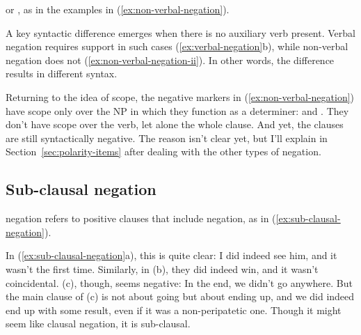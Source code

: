 \ea \label{ex:verbal-negation}
    \z
\z
\noindent or , as in the examples in (\ref{ex:non-verbal-negation}).

\ea \label{ex:non-verbal-negation}
    \label{ex:non-verbal-negation-i}
    \label{ex:non-verbal-negation-ii}
    \z
\z
A key syntactic difference emerges when there is no auxiliary verb present. Verbal negation requires  support in such cases (\ref{ex:verbal-negation}b), while non-verbal negation does not (\ref{ex:non-verbal-negation-ii}). In other words, the difference results in different syntax.

Returning to the idea of scope, the negative markers in (\ref{ex:non-verbal-negation}) have scope only over the NP in which they function as a determiner:  and . They don't have scope over the verb, let alone the whole clause. And yet, the clauses are still syntactically negative. The reason isn't clear yet, but I'll explain in Section~\ref{sec:polarity-items} after dealing with the other types of negation.

\subsection{Sub-clausal negation}

 negation refers to positive clauses that include negation, as in (\ref{ex:sub-clausal-negation}).

\ea \label{ex:sub-clausal-negation}
    \z
\z
In (\ref{ex:sub-clausal-negation}a), this is quite clear: I did indeed see him, and it wasn't the first time. Similarly, in (b), they did indeed win, and it wasn't coincidental. (c), though, seems negative: In the end, we didn't go anywhere. But the main clause of (c) is not about going but about ending up, and we did indeed end up with some result, even if it was a non-peripatetic one. Though it might seem like clausal negation, it is sub-clausal.

